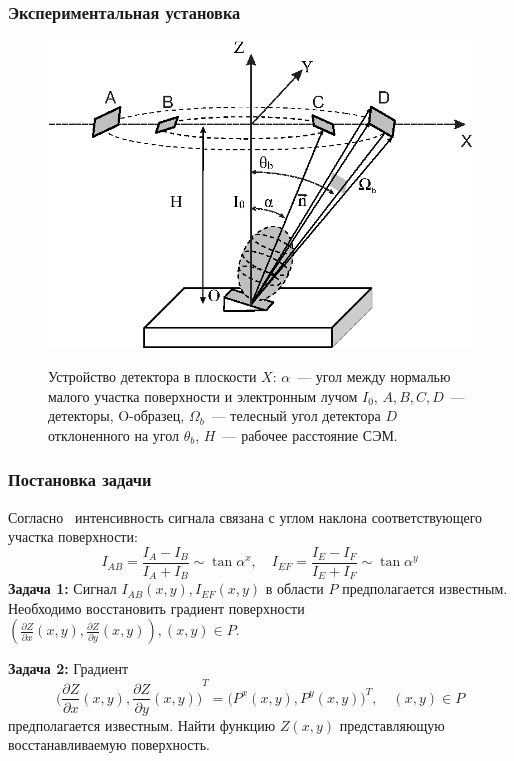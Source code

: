 \documentclass{beamer}
\begin{document}
\begin{frame}
    \frametitle{Экспериментальная установка}
    \begin{figure}
        \includegraphics[width=0.6\linewidth]{detector_structure.eps}
        \caption{Устройство детектора в плоскости $X$: $\alpha$~--- угол между нормалью малого
участка поверхности и электронным лучом $I_0$, $A,B,C,D$~--- детекторы, O-образец,
$\Omega_{b}$~--- телесный угол детектора $D$ отклоненного на угол $\theta_b$, $H$~--- рабочее
расстояние СЭМ.}
        {\label{fig:detector_structure}}%
    \end{figure}
\end{frame}

\begin{frame}
    \frametitle{Постановка задачи}
    Согласно~\cite{PaluszynskiSlowko2005Vacuum, DrzazgaPaluszynski2005Measurement} интенсивность
    сигнала связана с углом наклона соответствующего участка поверхности:
    $$
        I_{AB} = \frac{I_A - I_B}{I_A + I_B} \sim \tan{\alpha^x}, \quad
        I_{EF} = \frac{I_E - I_F}{I_E + I_F} \sim \tan{\alpha^y}
    $$
    \textbf{Задача 1:} Сигнал $I_{AB}(x,y), I_{EF}(x,y)$ в области $P$ предполагается известным.
    Необходимо восстановить градиент поверхности
    $
        \left(\frac{\partial Z}{\partial x}(x,y), \frac{\partial Z}{\partial y} (x,y) \right),
        (x,y) \in P
    $.

    \vfill

    \textbf{Задача 2:} Градиент
    \begin{equation}
        {\Big(\frac{\partial Z}{\partial x}(x,y),
        \frac{\partial Z}{\partial y} (x,y)\Big)}^{T} =
        {\big(P^x(x,y), P^y(x,y)\big)}^T, \quad (x,y) \in P
        \label{eq:problem_statement}
    \end{equation}
    предполагается известным. Найти функцию $Z(x,y)$ представляющую восстанавливаемую поверхность.
\end{frame}
\end{document}

